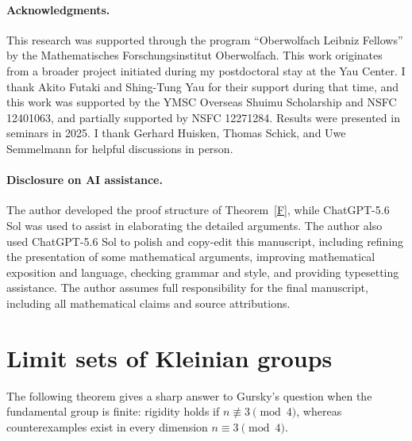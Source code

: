 \documentclass[12pt,oneside,a4paper]{article}
\theoremstyle{mytheorem}
\theoremstyle{remark}
\theoremstyle{definition}
\begin{document}
\paragraph*{Acknowledgments.}          
This research was supported through the program   ``Oberwolfach Leibniz Fellows'' by the Mathematisches Forschungsinstitut Oberwolfach.   This work originates from a broader project initiated during my postdoctoral stay at the Yau Center. I thank Akito Futaki and Shing-Tung Yau for their support during that time, and this work was supported by the YMSC Overseas Shuimu Scholarship and NSFC 12401063, and partially supported by NSFC 12271284. Results were presented in seminars in 2025. I thank Gerhard Huisken, Thomas Schick, and Uwe Semmelmann for helpful discussions in person. 


\paragraph*{Disclosure on AI assistance.}
The author developed the proof structure of Theorem~\ref{F}, while ChatGPT-5.6 Sol was used to assist in elaborating the detailed arguments. The author also used ChatGPT-5.6 Sol to polish and copy-edit this manuscript, including refining the presentation of some mathematical arguments, improving mathematical exposition and language, checking grammar and style, and providing typesetting assistance.
 The author assumes full responsibility for the final manuscript, including all mathematical claims and source attributions.





\section{Limit sets of Kleinian groups}\label{3}



The following theorem gives a sharp answer to Gursky's question when the fundamental group is finite: rigidity holds if \(n\not\equiv3\pmod4\), whereas counterexamples exist in every dimension \(n\equiv3\pmod4\).
\end{document}
